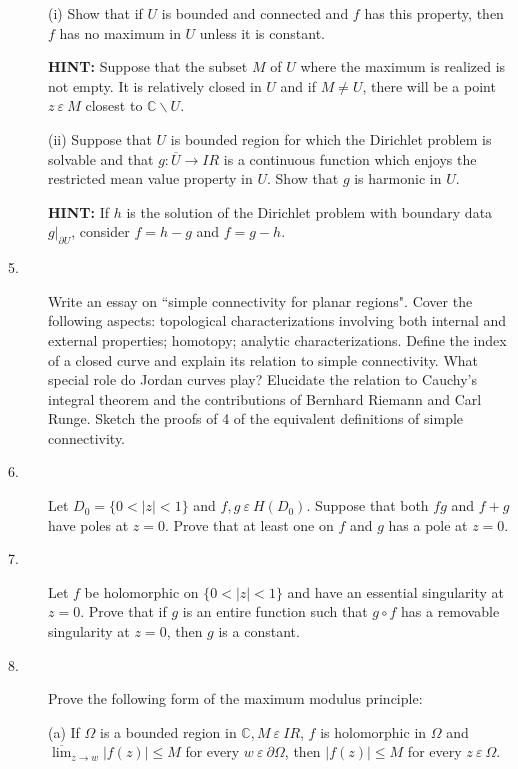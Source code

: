 \documentclass{article}
\def\C{\mathbb C}
\begin{document}
\begin{description}
\item[\quad] (i)
Show that if $U$ is bounded and connected and $f$ has this property, then
$f$ has no maximum in $U$ unless it is constant.

{\bf HINT:} Suppose that the subset $M$ of $U$ where the maximum is realized
is not empty. It is relatively closed in $U$ and if
$M \neq U$, there will be a point $z \ \varepsilon \ M$ closest to
$\C \backslash U$.

\item[\quad] (ii)
Suppose that $U$ is bounded region for which the Dirichlet problem is
solvable and that $g : \overline U  \to IR$ is a continuous function which
enjoys the restricted mean value property in $U$. Show that $g$ is harmonic
in $U$.

{\bf HINT:} If $h$ is the solution of the Dirichlet problem with boundary
data $g|_{\partial U}$, consider $f = h-g$ and $f= g-h$.

\item[5.]
Write an essay on ``simple connectivity for planar regions". Cover the
following aspects: topological characterizations involving both internal and
external properties; homotopy; analytic characterizations. Define the index
of a closed curve and explain its relation to simple connectivity. What
special role do Jordan curves play? Elucidate the relation to Cauchy's
integral theorem and the contributions of Bernhard Riemann and Carl Runge.
Sketch the proofs of 4 of the equivalent definitions of simple connectivity.

\item[6.]
Let $D_0 = \{0 < |z| < 1\}$ and $f,g \ \varepsilon \ H (D_0)$. Suppose that
both $fg$ and $f+g$ have poles at $z=0$. Prove that at least one on $f$
and $g$ has a pole at $z=0$.

\item[7.]
Let $f$ be holomorphic on $\{0 < |z| < 1\}$ and have an essential
singularity at $z=0$. Prove that if $g$ is an entire function such that
$g \circ f$ has a removable singularity at $z=0$, then $g$ is a constant.

\item[8.]
Prove the following form of the maximum modulus principle:

\item[\quad] (a)
If $\Omega$ is a bounded region in $\C, M \ \varepsilon \ IR$, $f$ is holomorphic
in $\Omega$ and $\overline{\lim}_{z \to w} |f(z)| \leq M$ for every
$w \ \varepsilon \ \partial \Omega$, then $|f(z)| \leq M$ for
every $z \ \varepsilon \ \Omega$.


\end{description}
\end{document}
